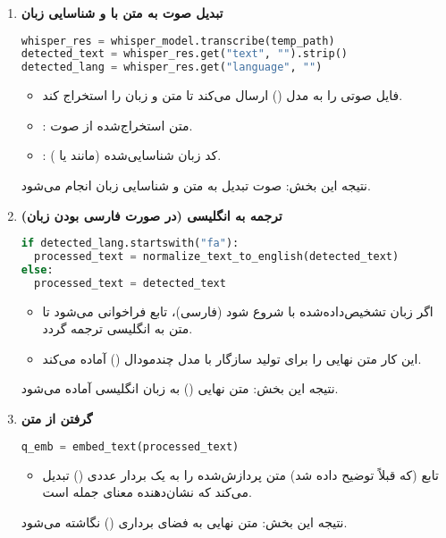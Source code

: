 \documentclass{article}
\begin{document}
\begin{enumerate}
    \item \textbf{تبدیل صوت به متن با  و شناسایی زبان}
        \begin{latin}
        \begin{lstlisting}[language=Python]
whisper_res = whisper_model.transcribe(temp_path)
detected_text = whisper_res.get("text", "").strip()
detected_lang = whisper_res.get("language", "")
        \end{lstlisting}
        \end{latin}
        \begin{itemize}
            \item {} فایل صوتی را به مدل  () ارسال می‌کند تا متن و زبان را استخراج کند.
            \item {}: متن استخراج‌شده از صوت.
            \item {}: کد زبان شناسایی‌شده (مانند  یا ).
        \end{itemize}
         نتیجه این بخش: صوت تبدیل به متن و شناسایی زبان انجام می‌شود.

    \item \textbf{ترجمه به انگلیسی (در صورت فارسی بودن زبان)}
        \begin{latin}
        \begin{lstlisting}[language=Python]
if detected_lang.startswith("fa"):
  processed_text = normalize_text_to_english(detected_text)
else:
  processed_text = detected_text
        \end{lstlisting}
        \end{latin}
        \begin{itemize}
            \item اگر زبان تشخیص‌داده‌شده با  شروع شود (فارسی)، تابع  فراخوانی می‌شود تا متن به انگلیسی ترجمه گردد.
            \item این کار متن نهایی را برای تولید  سازگار با مدل چندمودال () آماده می‌کند.
        \end{itemize}
         نتیجه این بخش: متن نهایی () به زبان انگلیسی آماده می‌شود.

    \item \textbf{گرفتن  از متن}
        \begin{latin}
        \begin{lstlisting}[language=Python]
q_emb = embed_text(processed_text)
        \end{lstlisting}
        \end{latin}
        \begin{itemize}
            \item تابع  (که قبلاً توضیح داده شد) متن پردازش‌شده را به یک بردار عددی () تبدیل می‌کند که نشان‌دهنده معنای جمله است.
        \end{itemize}
        نتیجه این بخش: متن نهایی به فضای برداری () نگاشته می‌شود.


\end{enumerate}
\end{document}
